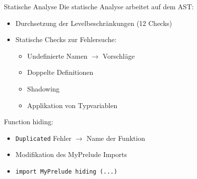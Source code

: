 \begin{frame}{Statische Analyse}
	Die statische Analyse arbeitet auf dem AST:
	\begin{itemize}
		\item Durchsetzung der Levelbeschränkungen (12 Checks)
		\item Statische Checks zur Fehlersuche:
		\begin{itemize}
			\item Undefinierte Namen $\rightarrow$ Vorschläge
			\item Doppelte Definitionen
			\item Shadowing
			\item Applikation von Typvariablen
		\end{itemize}
	\end{itemize}
	Function hiding:
	\begin{itemize}
		\item \texttt{Duplicated} Fehler $\rightarrow$ Name der Funktion
		\item Modifikation des MyPrelude Imports
		\item \texttt{import MyPrelude hiding (...)}
	\end{itemize}
\end{frame}